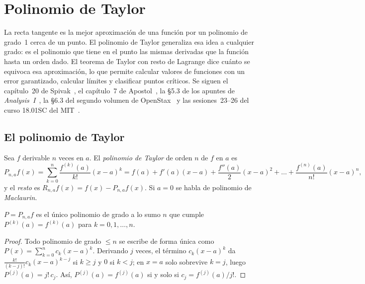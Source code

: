 \chapter{Polinomio de Taylor}
\label{tema:6}

La recta tangente es la mejor aproximación de una función por un polinomio de grado~1 cerca de un punto. El polinomio de Taylor generaliza esa idea a cualquier grado: es el polinomio que tiene en el punto las mismas derivadas que la función hasta un orden dado. El teorema de Taylor con resto de Lagrange dice cuánto se equivoca esa aproximación, lo que permite calcular valores de funciones con un error garantizado, calcular límites y clasificar puntos críticos. Se siguen el capítulo~20 de Spivak~\cite{spivak}, el capítulo~7 de Apostol~\cite{apostol}, la §5.3 de los apuntes de \emph{Analysis~I}~\cite{cambA1}, la §6.3 del segundo volumen de OpenStax~\cite{osc2} y las sesiones~23--26 del curso 18.01SC del MIT~\cite{mit1801}.

\section{El polinomio de Taylor}

\begin{definicion}\label{def:taylor}
Sea $f$ derivable $n$ veces en $a$. El \emph{polinomio de Taylor} de orden $n$ de $f$ en $a$ es
\[
P_{n,a}f(x)=\sum_{k=0}^{n}\frac{f^{(k)}(a)}{k!}(x-a)^{k}=f(a)+f'(a)(x-a)+\frac{f''(a)}{2}(x-a)^{2}+\dots+\frac{f^{(n)}(a)}{n!}(x-a)^{n},
\]
y el \emph{resto} es $R_{n,a}f(x)=f(x)-P_{n,a}f(x)$. Si $a=0$ se habla de polinomio de \emph{Maclaurin}.
\end{definicion}

\begin{proposicion}[Caracterización]\label{prop:taylor-unico}
$P=P_{n,a}f$ es el único polinomio de grado a lo sumo $n$ que cumple $P^{(k)}(a)=f^{(k)}(a)$ para $k=0,1,\dots,n$.
\end{proposicion}

\begin{proof}
Todo polinomio de grado $\le n$ se escribe de forma única como $P(x)=\sum_{k=0}^{n}c_k(x-a)^{k}$. Derivando $j$ veces, el término $c_k(x-a)^{k}$ da $\frac{k!}{(k-j)!}c_k(x-a)^{k-j}$ si $k\ge j$ y $0$ si $k<j$; en $x=a$ solo sobrevive $k=j$, luego $P^{(j)}(a)=j!\,c_j$. Así, $P^{(j)}(a)=f^{(j)}(a)$ si y solo si $c_j=f^{(j)}(a)/j!$.
\end{proof}

